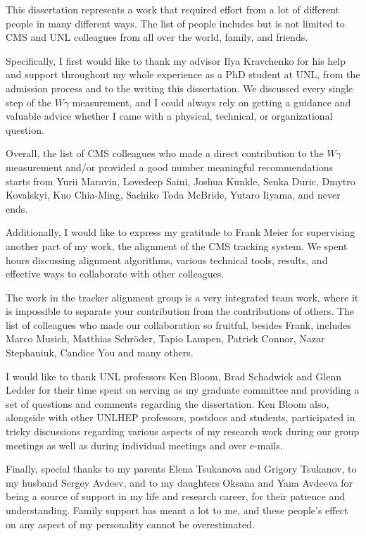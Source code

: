 \begin{acknowledgments}

This dissertation represents a work that required effort from a lot of different people in many different ways. The list of people includes but is not limited to CMS and UNL colleagues from all over the world, family, and friends.

Specifically, I first would like to thank my advisor Ilya Kravchenko for his help and support throughout my whole experience as a PhD student at UNL, from the admission process and to the writing this dissertation. We discussed every single step of the $W\gamma$ measurement, and I could always rely on getting a guidance and valuable advice whether I came with a physical, technical, or organizational question. 

Overall, the list of CMS colleagues who made a direct contribution to the $W\gamma$ measurement and/or provided a good number meaningful recommendations starts from Yurii Maravin, Lovedeep Saini, Joshua Kunkle, Senka Duric, Dmytro Kovalskyi, Kuo Chia-Ming, Sachiko Toda McBride, Yutaro Iiyama, and never ends. 

Additionally,  I would like to express my gratitude to Frank Meier for supervising another part of my work, the alignment of the CMS tracking system. We spent hours discussing alignment algorithms, various technical tools, results, and effective ways to collaborate with other colleagues. 

The work in the tracker alignment group is a very integrated team work, where it is impossible to separate your contribution from the contributions of others. The list of colleagues who made our collaboration so fruitful, besides Frank, includes Marco Musich, Matthias Schr\"{o}der, Tapio Lampen, Patrick Connor, Nazar Stephaniuk, Candice You and many others. 

I would like to thank UNL professors Ken Bloom, Brad Schadwick and Glenn Ledder for their time spent on serving as my graduate committee and providing a set of questions and comments regarding the dissertation. Ken Bloom also, alongside with other UNLHEP professors, postdocs and students, participated in tricky discussions regarding various aspects of my research work during our group meetings as well as during individual meetings and over e-mails. 

Finally, special thanks to my parents Elena Tsukanova and Grigory Tsukanov, to my husband Sergey Avdeev, and to my daughters Oksana and Yana Avdeeva for being a source of support in my life and research career, for their patience and understanding. Family support has meant a lot to me, and these people's effect on any aspect of my personality cannot be overestimated.



\end{acknowledgments}
